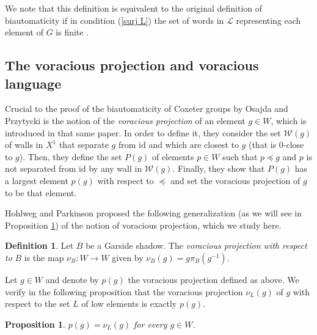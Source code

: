 \documentclass[a4paper,12pt,leqno]{amsart}
\newtheorem{prop}[theorem]{Proposition}
\theoremstyle{definition}
\newtheorem{defin}[theorem]{Definition}
\newcommand{\W}{\mathcal{W}}
\newcommand{\LL}{\mathcal{L}}
\newcommand{\id}{\text{id}}
\newcommand{\vr}{\nu}
\begin{document}
We note that this definition is equivalent to the original definition of biautomaticity if in condition (\ref{surj L}) the set of words in $\LL$ representing each element of $G$ is finite \cite[Thm 6]{biautomaticdef}.

\subsection{The voracious projection and voracious language}

Crucial to the proof of the biautomaticity of Coxeter groups by Osajda and Przytycki \cite{OP-bi} is the notion of the \emph{voracious projection} of an element $g \in W$, which is introduced in that same paper. In order to define it, they consider the set $\W(g)$ of walls in $X^1$ that separate $g$ from $\id$ and which are closest to $g$ (that is $0$-close to $g$). Then, they define the set $P(g)$ of elements $p \in W$ such that $p \preceq g$ and $p$ is not separated from $\id$ by any wall in $\W(g)$. Finally, they show that $P(g)$ has a largest element $p(g)$ with respect to $\preceq$ and set the voracious projection of $g$ to be that element.

Hohlweg and Parkinson proposed the following generalization (as we will see in Proposition \ref{vorOG}) of the notion of voracious projection, which we study here.

\begin{defin} \label{vorproj-def}
    Let $B$ be a Garside shadow. The \emph{voracious projection with respect to} $B$ is the map $\vr_B : W \to W$ given by $\nu_B(g) = g \pi_B(g^{-1})$.
\end{defin}

Let $g \in W$ and denote by $p(g)$ the voracious projection defined as above. We verify in the following proposition that the voracious projection $\vr_L(g)$ of $g$ with respect to the set $L$ of low elements is exactly $p(g)$. 

\begin{prop} \label{vorOG}
    $p(g) = \vr_L(g)$ for every $g \in W$.
\end{prop}
\end{document}
